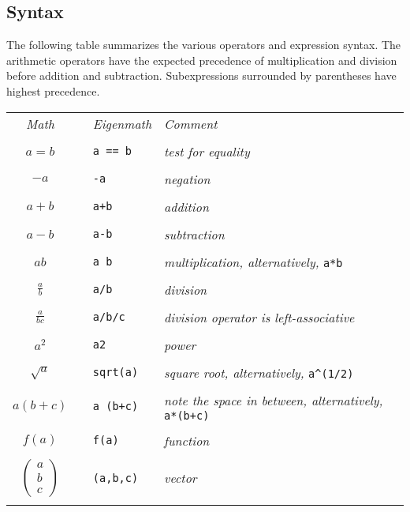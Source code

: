 \subsection{Syntax}
The following table summarizes the various operators and expression syntax.
The arithmetic operators have the expected precedence of
multiplication and division before addition and subtraction.
Subexpressions surrounded by parentheses have highest precedence.

\begin{center}
\begin{tabular}{clll}
{\it Math} & & {\it Eigenmath} & {\it Comment} \\
\\
$a=b$ & & \verb$a == b$ & {\it test for equality} \\
\\
$-a$ & & {\tt -a} & {\it negation} \\
\\
$a+b$ & & {\tt a+b} & {\it addition} \\
\\
$a-b$ & & {\tt a-b} & {\it subtraction} \\
\\
$ab$ & & {\tt a b} & {\it multiplication, alternatively,} \verb$a*b$ \\
\\
$\displaystyle\frac{a}{b}$ & & {\tt a/b} & {\it division}\\
\\
$\displaystyle\frac{a}{bc}$ & & {\tt a/b/c} & {\it division operator is left-associative} \\
\\
$a^2$ & & {\tt a{\char94}2} & {\it power}\\
\\
$\sqrt{a}$ & & \verb$sqrt(a)$ & {\it square root, alternatively,} \verb$a^(1/2)$ \\
\\
$a(b+c)$ & & {\tt a (b+c)} & {\it note the space in between, alternatively,} \verb$a*(b+c)$ \\
\\
$f(a)$ & & {\tt f(a)} & {\it function} \\
\\
$\begin{pmatrix}a\\ b\\ c\end{pmatrix}$ & & {\tt (a,b,c)} & {\it vector} \\
\\

\end{tabular}
\end{center}
